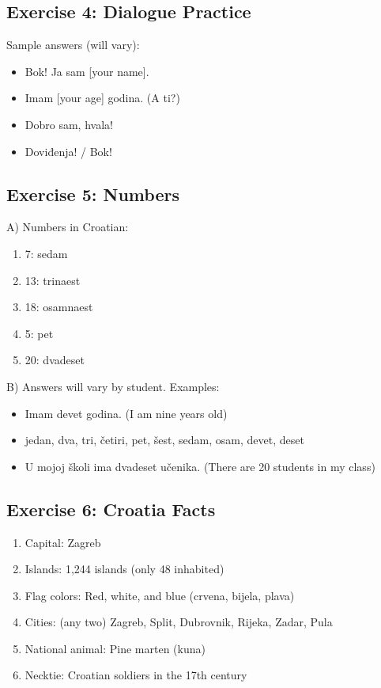 \subsection*{Exercise 4: Dialogue Practice}

Sample answers (will vary):
\begin{itemize}
    \item Bok! Ja sam [your name].
    \item Imam [your age] godina. (A ti?)
    \item Dobro sam, hvala!
    \item Doviđenja! / Bok!
\end{itemize}

\subsection*{Exercise 5: Numbers}

A) Numbers in Croatian:
\begin{enumerate}
    \item 7: sedam
    \item 13: trinaest
    \item 18: osamnaest
    \item 5: pet
    \item 20: dvadeset
\end{enumerate}

B) Answers will vary by student. Examples:
\begin{itemize}
    \item Imam devet godina. (I am nine years old)
    \item jedan, dva, tri, četiri, pet, šest, sedam, osam, devet, deset
    \item U mojoj školi ima dvadeset učenika. (There are 20 students in my class)
\end{itemize}

\subsection*{Exercise 6: Croatia Facts}

\begin{enumerate}
    \item Capital: Zagreb
    \item Islands: 1,244 islands (only 48 inhabited)
    \item Flag colors: Red, white, and blue (crvena, bijela, plava)
    \item Cities: (any two) Zagreb, Split, Dubrovnik, Rijeka, Zadar, Pula
    \item National animal: Pine marten (kuna)
    \item Necktie: Croatian soldiers in the 17th century
\end{enumerate}

